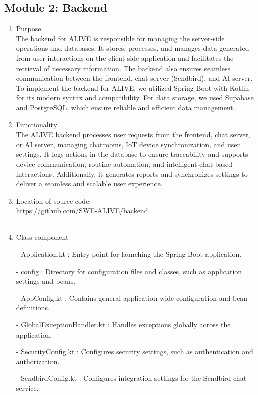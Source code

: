 \documentclass[conference]{IEEEtran}
\begin{document}
\begin{enumerate}
\begin{itemize}
\begin{itemize}
\begin{enumerate}
\subsection{Module 2: Backend}
\begin{enumerate}
    \item Purpose\\
    The backend for ALIVE is responsible for managing the server-side operations and databases. It stores, processes, and manages data generated from user interactions on the client-side application and facilitates the retrieval of necessary information. The backend also ensures seamless communication between the frontend, chat server (Sendbird), and AI server. To implement the backend for ALIVE, we utilized Spring Boot with Kotlin for its modern syntax and compatibility. For data storage, we used Supabase and PostgreSQL, which ensure reliable and efficient data management. \\
    \item Functionality\\
    The ALIVE backend processes user requests from the frontend, chat server, or AI server, managing chatrooms, IoT device synchronization, and user settings. It logs actions in the database to ensure traceability and supports device communication, routine automation, and intelligent chat-based interactions. Additionally, it generates reports and synchronizes settings to deliver a seamless and scalable user experience. \\
    \item Location of source code:\\ https://github.com/SWE-ALIVE/backend \\ \\
    \item Class component
        \item[-] Application.kt : Entry point for launching the Spring Boot application. \\

        \item[-] config : Directory for configuration files and classes, such as application settings and beans.\\
        \item[-] AppConfig.kt : Contains general application-wide configuration and bean definitions.\\
        \item[-] GlobalExceptionHandler.kt : Handles exceptions globally across the application.\\
        \item[-] SecurityConfig.kt : Configures security settings, such as authentication and authorization.\\
        \item[-] SendbirdConfig.kt : Configures integration settings for the Sendbird chat service.\\
        

\end{enumerate}
\end{enumerate}
\end{itemize}
\end{itemize}
\end{enumerate}
\end{document}
